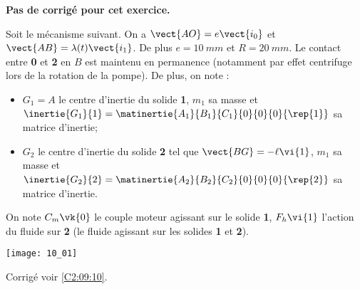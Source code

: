 \normaltrue \difficilefalse \tdifficilefalse
\correctionfalse


\setcounter{numques}{0}
\ifcorrection
\else
\textbf{Pas de corrigé pour cet exercice.}
\fi

\ifprof
\else
Soit le mécanisme suivant. On a $\vect{AO}=e\vect{i_0}$ et $\vect{AB}=\lambda(t)\vect{i_1}$. De plus $e=\SI{10}{mm}$ et $R=\SI{20}{mm}$. Le contact entre \textbf{0} et \textbf{2} en $B$ est maintenu en permanence (notamment par effet centrifuge lors de la rotation de la pompe). De plus, on note :
\begin{itemize}
\item $G_1 = A$ le centre d'inertie du solide \textbf{1}, $m_1$ sa masse et $\inertie{G_1}{1}=\matinertie{A_1}{B_1}{C_1}{0}{0}{0}{\rep{1}}$ sa matrice d'inertie;
\item $G_2$ le centre d'inertie du solide \textbf{2} tel que $\vect{BG}=-\ell \vi{1}$, $m_1$ sa masse et $\inertie{G_2}{2}=\matinertie{A_2}{B_2}{C_2}{0}{0}{0}{\rep{2}}$ sa matrice d'inertie.
\end{itemize}
On note $C_m\vk{0}$ le couple moteur agissant sur le solide \textbf{1}, $F_h\vi{1}$ l'action du fluide sur \textbf{2} (le fluide agissant sur les solides \textbf{1} et \textbf{2}). 
\begin{center}
\texttt{[image: 10\_01]}
\end{center}
\fi

\ifprof
\else
\fi

\ifprof
\else
\fi

\ifprof
\else
\fi

\ifprof
\else
\fi

\ifprof
\else
\fi


\ifprof
\else
\begin{flushright}
\footnotesize{Corrigé  voir \ref{C2:09:10}.}
\end{flushright}%
\fi
